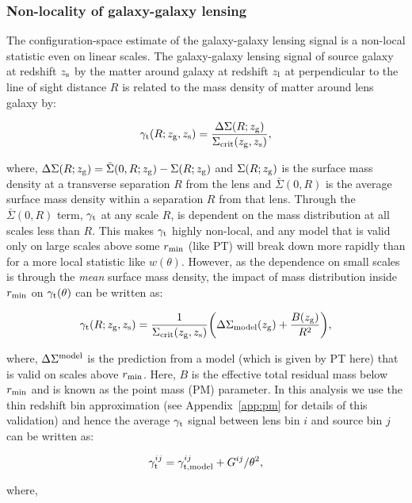 \documentclass[aps, prd,twocolumn,superscriptaddress,nofootinbib,preprintnumbers]{revtex4-1}
\newcommand{\gammat}{\ensuremath{\gamma_{\rm t}(\theta)}}
\newcommand{\wtheta}{\ensuremath{w(\theta)}}
\begin{document}
\subsubsection{Non-locality of galaxy-galaxy lensing}  \label{sec:pm_theory}
The configuration-space estimate of the galaxy-galaxy lensing signal is a
non-local statistic even on linear scales. The galaxy-galaxy lensing
signal of source galaxy at redshift $z_{\rm s}$ by the matter around
galaxy at redshift $z_{\rm l}$ at perpendicular to the line of sight
distance $R$ is related to the mass density of matter around lens
galaxy by:
\begin{linenomath*}
\begin{equation}
    \gamma_{\rm t}(R;z_{\rm g},z_{\rm s}) = \frac{\Delta \Sigma (R;z_{\rm g})}{\Sigma_{\rm crit} (z_{\rm g},z_{\rm s})},
\end{equation}
\end{linenomath*}
where, $\Delta \Sigma(R;z_{\rm g}) = \bar{\Sigma}(0,R; z_{\rm g}) - \Sigma(R;z_{\rm g})$ and $\Sigma(R;z_{\rm g})$ is the surface mass density at a transverse separation $R$ from the lens and $\bar{\Sigma}(0,R)$ is the average surface mass density within a separation $R$ from that lens. Through the $\bar{\Sigma}(0,R)$ term, $\gamma_{\rm t}$  at any scale $R$, is dependent on the mass distribution at all scales less than $R$. This makes $\gamma_{\rm t}$  highly non-local, and any model that is valid only on large scales above some $r_{\rm min}$ (like PT) will break down more rapidly than for a more local statistic like \wtheta. However, as the dependence on small scales is through the \textit{mean} surface mass density, the impact of mass distribution inside $r_{\rm min}$ on $\gammat$ can be written as:
\begin{linenomath*}
\begin{equation}
    \gamma_{\rm t}(R;z_{\rm g},z_{\rm s}) = \frac{1}{\Sigma_{\rm crit}(z_{\rm g},z_{\rm s})} \bigg(\Delta \Sigma_{\rm model}(z_{\rm g}) + \frac{B(z_{\rm g})}{R^2} \bigg),
\end{equation}
\end{linenomath*}
where, $\Delta \Sigma^{\rm model}$ is the prediction from a model (which is given by PT here) that is valid on scales above $r_{\rm min}$. Here, $B$ is the effective total residual mass below $r_{\rm min}$ and is known as the point mass (PM) parameter. In this analysis we use the thin redshift bin approximation (see Appendix~\ref{app:pm} for details of this validation) and hence the average $\gamma_{\rm t}$ signal between lens bin $i$ and source bin $j$ can be written as:
\begin{linenomath*}
\begin{equation}
    \gamma^{ij}_{{\rm t}} = \gamma^{ij}_{{\rm t, model}} + G^{ij}/\theta^2,
\end{equation}
\end{linenomath*}
where,
\end{document}
